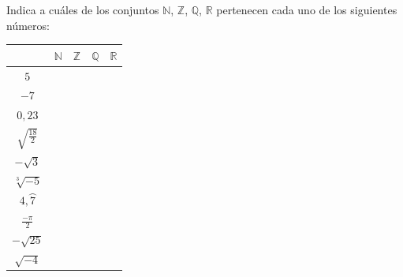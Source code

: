\documentclass[addpoints,spanish, 12pt,a4paper]{exam}
\begin{document}
\begin{questions}



\question[1] Indica a cuáles de los conjuntos
$\mathbb{N}$, $\mathbb{Z}$, $\mathbb{Q}$, $\mathbb{R}$ pertenecen cada uno de los siguientes números:
\begin{center}
\begin{tabular}{|c |c |c |c |c|}\hline
&$\mathbb{N}$& $\mathbb{Z}$& $\mathbb{Q}$&$\mathbb{R}$\\ 
\hline
$5$&&&&\\
\hline
$-7$&&&&\\
\hline
$0,23$&&&&\\
\hline
$\sqrt{\frac{18}{2}}$&&&&\\
\hline
$-\sqrt{3}$&&&&\\
\hline
$\sqrt[3]{-5}$&&&&\\
\hline
$4,\wideparen{7}$&&&&\\
\hline
$\frac{-\pi}{2}$&&&&\\
\hline
$-\sqrt{25}$&&&&\\
\hline
$\sqrt{-4}$&&&&\\
\hline
\end{tabular}

\end{center}


\end{questions}
\end{document}
